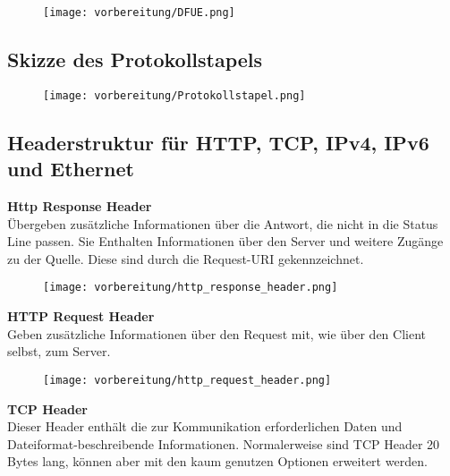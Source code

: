     \begin{figure}[ht]
        \centering
        \texttt{[image: vorbereitung/DFUE.png]}
    \end{figure}
\subsection{Skizze des Protokollstapels}

    \begin{figure}[ht]
        \centering
        \texttt{[image: vorbereitung/Protokollstapel.png]}
    \end{figure}

\subsection{Headerstruktur für HTTP, TCP, IPv4, IPv6 und Ethernet}

    \textbf{Http Response Header}
    \\
    Übergeben zusätzliche Informationen über die Antwort, die nicht in die Status Line passen. Sie Enthalten Informationen über den Server und weitere Zugänge zu der Quelle. Diese sind durch die Request-URI gekennzeichnet.\\

    \begin{figure}[ht]
        \centering
        \texttt{[image: vorbereitung/http\_response\_header.png]}
    \end{figure}

    \textbf{HTTP Request Header}
    \\
    Geben zusätzliche Informationen über den Request mit, wie über den Client selbst, zum Server. \\
    \begin{figure}[ht]
        \centering
        \texttt{[image: vorbereitung/http\_request\_header.png]}
    \end{figure}

    \textbf{TCP Header}
    \\
    Dieser Header enthält die zur Kommunikation erforderlichen Daten und Dateiformat-beschreibende Informationen. Normalerweise sind TCP Header 20 Bytes lang, können aber mit den kaum genutzen Optionen erweitert werden.\\

